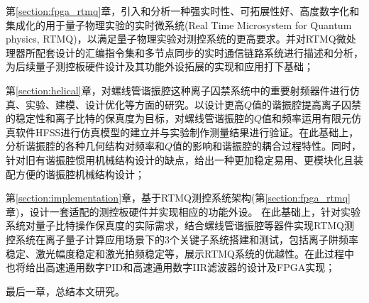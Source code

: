第\ref{section:fpga_rtmq}章，引入和分析一种强实时性、可拓展性好、高度数字化和集成化的用于量子物理实验的实时微系统(Real Time Microsystem for Quantum physics, RTMQ)，以满足量子物理实验对测控系统的更高要求。并对RTMQ微处理器所配套设计的汇编指令集和多节点同步的实时通信链路系统进行描述和分析，为后续量子测控板硬件设计及其功能外设拓展的实现和应用打下基础；

第\ref{section:helical}章，对螺线管谐振腔这种离子囚禁系统中的重要射频器件进行仿真、实验、建模、设计优化等方面的研究。以设计更高$Q$值的谐振腔提高离子囚禁的稳定性和离子比特的保真度为目标，对螺线管谐振腔的$Q$值和频率运用有限元仿真软件HFSS进行仿真模型的建立并与实验制作测量结果进行验证。在此基础上，分析谐振腔的各种几何结构对频率和$Q$值的影响和谐振腔的耦合过程特性。同时，针对旧有谐振腔惯用机械结构设计的缺点，给出一种更加稳定易用、更模块化且装配方便的谐振腔机械结构设计；

第\ref{section:implementation}章，基于RTMQ测控系统架构(第\ref{section:fpga_rtmq}章)，设计一套适配的测控板硬件并实现相应的功能外设。
在此基础上，针对实验系统对量子比特操作保真度的实际需求，结合螺线管谐振腔等器件实现RTMQ测控系统在离子量子计算应用场景下的3个关键子系统搭建和测试，包括离子阱频率稳定、激光幅度稳定和激光拍频稳定等，展示RTMQ系统的优越性。在此过程中也将给出高速通用数字PID和高速通用数字IIR滤波器的设计及FPGA实现；

最后一章，总结本文研究。

